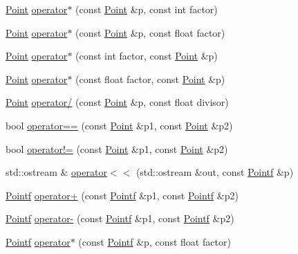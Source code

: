 \begin{DoxyCompactItemize}
\item 
\hyperlink{classprism_1_1_point}{Point} \hyperlink{namespaceprism_a40976ce143923309d4c737bb8288d9e5}{operator$\ast$} (const \hyperlink{classprism_1_1_point}{Point} \&p, const int factor)
\item 
\hyperlink{classprism_1_1_point}{Point} \hyperlink{namespaceprism_a96e41c0858ff4149eafa1bc878dabb7c}{operator$\ast$} (const \hyperlink{classprism_1_1_point}{Point} \&p, const float factor)
\item 
\hyperlink{classprism_1_1_point}{Point} \hyperlink{namespaceprism_aa46a547ddc48425588986b0840d026a4}{operator$\ast$} (const int factor, const \hyperlink{classprism_1_1_point}{Point} \&p)
\item 
\hyperlink{classprism_1_1_point}{Point} \hyperlink{namespaceprism_a1ec2671f1e6c155a79740a8556baecc0}{operator$\ast$} (const float factor, const \hyperlink{classprism_1_1_point}{Point} \&p)
\item 
\hyperlink{classprism_1_1_point}{Point} \hyperlink{namespaceprism_a5f73aee33931e5b9977da32e50d47c0e}{operator/} (const \hyperlink{classprism_1_1_point}{Point} \&p, const float divisor)
\item 
bool \hyperlink{namespaceprism_a739baa4e75c1ca83624d486eec1d45e9}{operator==} (const \hyperlink{classprism_1_1_point}{Point} \&p1, const \hyperlink{classprism_1_1_point}{Point} \&p2)
\item 
bool \hyperlink{namespaceprism_a75cab41d882d24ca064927f2390ef3a6}{operator!=} (const \hyperlink{classprism_1_1_point}{Point} \&p1, const \hyperlink{classprism_1_1_point}{Point} \&p2)
\item 
std\+::ostream \& \hyperlink{namespaceprism_acad408bf2576dfc62a573cb44aa895fb}{operator$<$$<$} (std\+::ostream \&out, const \hyperlink{classprism_1_1_pointf}{Pointf} \&p)
\item 
\hyperlink{classprism_1_1_pointf}{Pointf} \hyperlink{namespaceprism_a64243aa2d4cf6ddb70526aaeda396f82}{operator+} (const \hyperlink{classprism_1_1_pointf}{Pointf} \&p1, const \hyperlink{classprism_1_1_pointf}{Pointf} \&p2)
\item 
\hyperlink{classprism_1_1_pointf}{Pointf} \hyperlink{namespaceprism_a435d5c45d873875f2c5092d102eddb78}{operator-\/} (const \hyperlink{classprism_1_1_pointf}{Pointf} \&p1, const \hyperlink{classprism_1_1_pointf}{Pointf} \&p2)
\item 
\hyperlink{classprism_1_1_pointf}{Pointf} \hyperlink{namespaceprism_ade1984e58679ef4d8fcdd37726ee6483}{operator$\ast$} (const \hyperlink{classprism_1_1_pointf}{Pointf} \&p, const float factor)

\end{DoxyCompactItemize}
